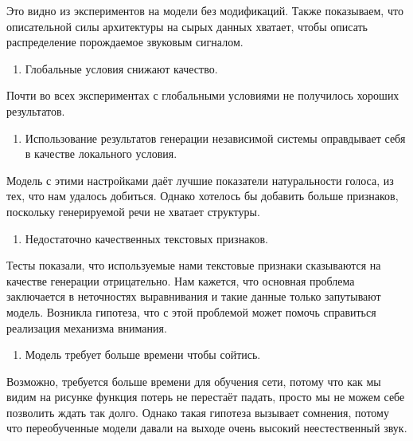 \documentclass[../diploma.tex]{subfiles}
\begin{document}
Это видно из экспериментов на модели без модификаций. Также показываем, что описательной силы архитектуры на сырых данных хватает, чтобы описать распределение порождаемое звуковым сигналом.

\begin{enumerate}[resume]
    \item Глобальные условия снижают качество.
\end{enumerate}

Почти во всех экспериментах с глобальными условиями не получилось хороших результатов.

\begin{enumerate}[resume]
    \item Использование результатов генерации независимой системы оправдывает себя  в качестве локального условия.
\end{enumerate}

Модель с этими настройками даёт лучшие показатели натуральности голоса, из тех, что нам удалось добиться. Однако хотелось бы добавить больше признаков, поскольку генерируемой речи не хватает структуры.

\begin{enumerate}[resume]
    \item Недостаточно качественных текстовых признаков.
\end{enumerate}

Тесты показали, что используемые нами текстовые признаки сказываются на качестве генерации отрицательно. Нам кажется, что основная проблема заключается в неточностях выравнивания и такие данные только запутывают модель. Возникла гипотеза, что с этой проблемой может помочь справиться реализация механизма внимания.

\begin{enumerate}[resume]
    \item Модель требует больше времени чтобы сойтись.
\end{enumerate}
Возможно, требуется больше времени для обучения сети, потому что как мы видим на рисунке \label{fig:perf} функция потерь не перестаёт падать, просто мы не можем себе позволить ждать так долго.
Однако такая гипотеза вызывает сомнения, потому что переобученные модели давали на выходе очень высокий неестественный звук.

\newpage
\end{document}
